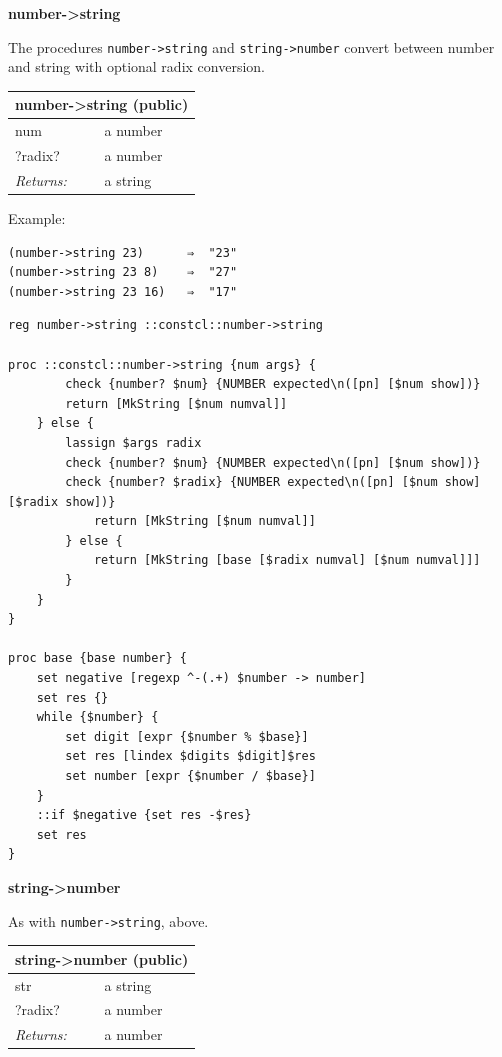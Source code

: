 \documentclass[twoside,9pt]{report}
\begin{document}
\textbf{number->string}


The procedures \texttt{number->string} and \texttt{string->number} convert between number and string with optional radix conversion.

\begin{tabular}{ |l l| }
\hline
\multicolumn{2}{|l|}{number->string (public)} \\
\hline
num & a number \\
?radix? & a number \\
\textit{Returns:} & a string \\
\hline
\end{tabular}


Example:

\noindent\makebox[\linewidth]{\rule{\linewidth}{0.4pt}}
\begin{lstlisting}
(number->string 23)      ⇒  "23"
(number->string 23 8)    ⇒  "27"
(number->string 23 16)   ⇒  "17"
\end{lstlisting}
\noindent\makebox[\linewidth]{\rule{\linewidth}{0.4pt}}
\noindent\makebox[\linewidth]{\rule{\linewidth}{0.4pt}}
\begin{lstlisting}
reg number->string ::constcl::number->string
 
proc ::constcl::number->string {num args} {
        check {number? $num} {NUMBER expected\n([pn] [$num show])}
        return [MkString [$num numval]]
    } else {
        lassign $args radix
        check {number? $num} {NUMBER expected\n([pn] [$num show])}
        check {number? $radix} {NUMBER expected\n([pn] [$num show] [$radix show])}
            return [MkString [$num numval]]
        } else {
            return [MkString [base [$radix numval] [$num numval]]]
        }
    }
}
 
proc base {base number} {
    set negative [regexp ^-(.+) $number -> number]
    set res {}
    while {$number} {
        set digit [expr {$number % $base}]
        set res [lindex $digits $digit]$res
        set number [expr {$number / $base}]
    }
    ::if $negative {set res -$res}
    set res
}
\end{lstlisting}
\noindent\makebox[\linewidth]{\rule{\linewidth}{0.4pt}}

\textbf{string->number}


As with \texttt{number->string}, above.

\begin{tabular}{ |l l| }
\hline
\multicolumn{2}{|l|}{string->number (public)} \\
\hline
str & a string \\
?radix? & a number \\
\textit{Returns:} & a number \\
\hline
\end{tabular}
\end{document}
